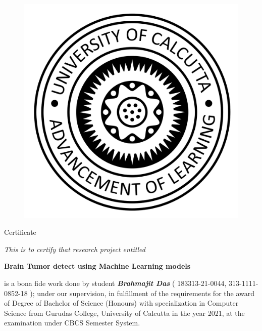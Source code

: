 
\section*{}
\label{sec:ceritficate}

\begin{figure}[h]
	\centering
	\includegraphics[width=0.3\linewidth]{imgs/cu_logo.png}
	\caption*{}%
	\label{fig:cu_logo_cert}
\end{figure}



\begin{center}
	{ \Huge Certificate }

	\vspace{1cm}
	{ \Large \textit{This is to certify that research project entitled}}

	\vspace{1cm}
	{\Large \textbf{Brain Tumor detect using Machine Learning models} }

	\vspace{1cm}
	\onehalfspacing
	\begin{adjustwidth}{40pt}{40pt}
	{\Large
		is a bona fide work done by student \textit{ \textbf{Brahmajit Das}  } (
		183313-21-0044, 313-1111-0852-18 ); under our supervision, in
		fulfillment of the requirements for the award of Degree of Bachelor of
		Science (Honours) with specialization in Computer Science from Gurudas
		College, University of Calcutta in the year 2021, at the examination
		under CBCS Semester System.
	}
	\end{adjustwidth}
	\singlespacing
\end{center}

\vspace{0.5cm}

